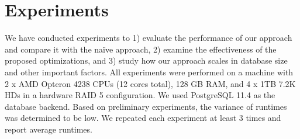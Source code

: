 \section{Experiments}
\label{sec:experiments}


\newcommand{\mn}{\textit{N}\xspace}
\newcommand{\mr}{\textit{R}\xspace}
\newcommand{\mrd}{\textit{R+DS}\xspace}
\newcommand{\mrp}{\textit{R+PS}\xspace}
\newcommand{\mrdp}{\textit{R+PS+DS}\xspace}

%
%
%
%
%
%
%
%
%
%
%
%
%
%

We have conducted experiments to 1) evaluate the performance of our approach and compare it with the naïve approach, 2) examine the effectiveness of the proposed optimizations, and 3) study how our approach scales in database size and %
other important factors.
All experiments were performed on a machine with 2 x AMD Opteron 4238 CPUs (12 cores total), 128 GB RAM, and 4 x 1TB 7.2K
HDs in a hardware RAID 5 configuration. We used PostgreSQL 11.4 as the database backend.
%
Based on preliminary experiments, the variance of runtimes was determined to be low. We repeated each experiment at least 3 times and report average runtimes.
%
%
%
%
%
%

